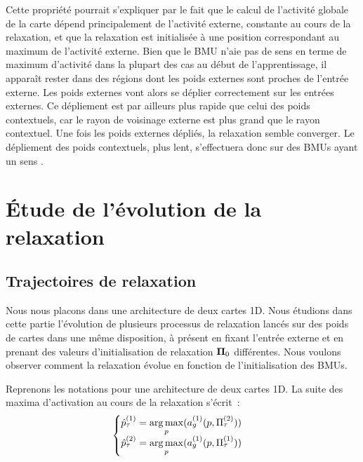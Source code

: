 \documentclass[../main]{subfiles}
\begin{document}
Cette propriété pourrait s'expliquer par le fait que le calcul de l'activité globale de la carte dépend principalement de l'activité externe, constante au cours de la relaxation, et que la relaxation est initialisée à une position correspondant au maximum de l'activité externe.
Bien que le BMU n'aie pas de \og sens \fg{} en terme de maximum d'activité dans la plupart des cas au début de l'apprentissage, il apparaît rester dans des régions dont les poids externes sont proches de l'entrée externe.
Les poids externes vont alors se déplier correctement sur les entrées externes. Ce dépliement est par ailleurs plus rapide que celui des poids contextuels, car le rayon de voisinage externe est plus grand que le rayon contextuel.
Une fois les poids externes dépliés, la relaxation semble converger. Le dépliement des poids contextuels, plus lent, s'effectuera donc sur des BMUs ayant un \og sens \fg{}.

\section{\'Etude de l'évolution de la relaxation}

\subsection{Trajectoires de relaxation\label{sec:relax_expe}}

Nous nous placons dans une architecture de deux cartes 1D.
Nous étudions dans cette partie l'évolution de plusieurs processus de relaxation lancés sur des poids de cartes dans une même disposition, à présent en fixant l'entrée externe et en prenant des valeurs d'initialisation de relaxation $\mathbf{\Pi}_0$ différentes.
Nous voulons observer comment la relaxation évolue en fonction de l'initialisation des BMUs.


Reprenons les notations pour une architecture de deux cartes 1D. La suite des maxima d'activation au cours de la relaxation s'écrit~:
\begin{equation*}
	\begin{cases}
	\hat{p}^{({1})}_\tau = \operatorname*{arg\,max}\limits_p(a_g^{({1})}(p, \Pi^{({2})}_\tau))\\
	\hat{p}^{({2})}_\tau = \operatorname*{arg\,max}\limits_p(a_g^{({1})}(p, \Pi^{({1})}_\tau)) \\
	\end{cases}
	\end{equation*}
\end{document}
